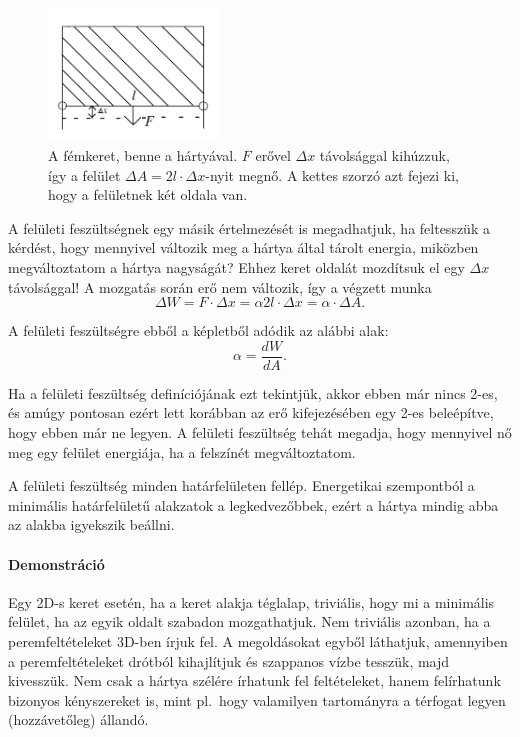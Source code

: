 \documentclass[12pt,a4paper]{scrartcl}
\begin{document}
\begin{figure}[htbp]
	\begin{center}
		\includegraphics[width=0.4\textwidth]{tetel7.png}
		\caption{A fémkeret, benne a hártyával. $F$ erővel $\Delta x$ távolsággal kihúzzuk, így a felület $\Delta A =  2l \cdot \Delta x$-nyit megnő. A kettes szorzó azt fejezi ki, hogy a felületnek két oldala van.}
	\end{center}
\end{figure}

A felületi feszültségnek egy másik értelmezését is megadhatjuk, ha feltesszük a kérdést, hogy mennyivel változik meg a hártya által tárolt energia, miközben megváltoztatom a hártya nagyságát? Ehhez keret oldalát mozdítsuk el egy $\Delta x$ távolsággal! A mozgatás során erő nem változik, így a végzett munka
\[\Delta W = F \cdot \Delta x = \alpha 2l \cdot \Delta x = \alpha  \cdot \Delta A.\]

A felületi feszültségre ebből a képletből adódik az alábbi alak:
\[\alpha  = \frac{{dW}}{{dA}}.\]

Ha a felületi feszültség definíciójának ezt tekintjük, akkor ebben már nincs 2-es, és amúgy pontosan ezért lett korábban az erő kifejezésében egy 2-es beleépítve, hogy ebben már ne legyen. A felületi feszültség tehát megadja, hogy mennyivel nő meg egy felület energiája, ha a felszínét megváltoztatom.

A felületi feszültség minden határfelületen fellép. Energetikai szempontból a minimális határfelületű alakzatok a legkedvezőbbek, ezért a hártya mindig abba az alakba igyekszik beállni. 

\footnotesize
\paragraph{Demonstráció} Egy 2D-s keret esetén, ha a keret alakja téglalap, triviális, hogy mi a minimális felület, ha az egyik oldalt szabadon mozgathatjuk. Nem triviális azonban, ha a peremfeltételeket 3D-ben írjuk fel. A megoldásokat egyből láthatjuk, amennyiben a peremfeltételeket drótból kihajlítjuk és szappanos vízbe tesszük, majd kivesszük. Nem csak a hártya szélére írhatunk fel feltételeket, hanem felírhatunk bizonyos kényszereket is, mint pl.\ hogy valamilyen tartományra a térfogat legyen (hozzávetőleg) állandó.
\normalsize
\end{document}
